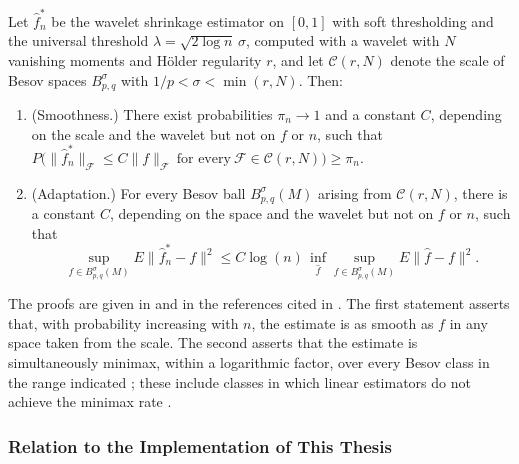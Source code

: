 \begin{theorem}
\label{thm:wavelet_minimax}
Let $\hat{f}^*_n$ be the wavelet shrinkage estimator on $[0,1]$ with soft
thresholding and the universal threshold $\lambda = \sqrt{2\log n}\,\sigma$,
computed with a wavelet with $N$ vanishing moments and H\"older regularity
$r$, and let $\mathcal{C}(r,N)$ denote the scale of Besov spaces
$B^\sigma_{p,q}$ with $1/p<\sigma<\min(r,N)$. Then:
\begin{enumerate}
\item (Smoothness.) There exist probabilities $\pi_n\to 1$ and a constant
$C$, depending on the scale and the wavelet but not on $f$ or $n$, such that
$P\bigl(\|\hat{f}^*_n\|_{\mathcal{F}}\leq C\|f\|_{\mathcal{F}}\ \text{for
every}\ \mathcal{F}\in\mathcal{C}(r,N)\bigr)\geq\pi_n$.
\item (Adaptation.) For every Besov ball $B^\sigma_{p,q}(M)$ arising from
$\mathcal{C}(r,N)$, there is a constant $C$, depending on the space and the
wavelet but not on $f$ or $n$, such that
\begin{equation*}
\sup_{f\in B^\sigma_{p,q}(M)}E\|\hat{f}^*_n-f\|^2\leq C\log(n)\,
\inf_{\hat{f}}\sup_{f\in B^\sigma_{p,q}(M)}E\|\hat{f}-f\|^2.
\end{equation*}
\end{enumerate}
\end{theorem}

The proofs are given in \cite{donoho1998} and in the references cited in
\cite[Sec.~6.4]{vidakovic1999}. The first statement asserts that, with probability increasing with $n$,
the estimate is as smooth as $f$ in any space taken from the scale. The
second asserts that the estimate is simultaneously minimax, within a
logarithmic factor, over every Besov class in the range indicated
\cite[Sec.~6.4]{vidakovic1999}; these include classes in which linear
estimators do not achieve the minimax rate \cite[Sec.~6.1]{vidakovic1999}.

\subsubsection{Relation to the Implementation of This Thesis}

